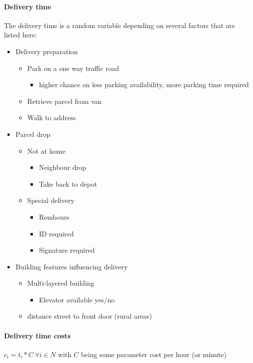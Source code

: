 \documentclass[a4paper,10pt,twoside]{report}
\begin{document}
\paragraph{Delivery time}
The delivery time is a random variable depending on several factors that are listed here: 
\begin{itemize}
\item Delivery preparation
\begin{itemize}
\item Park on a one way traffic road 
\begin{itemize}
\item higher chance on less parking availability, more parking time required
\end{itemize}
\item Retrieve parcel from van
\item Walk to address
\end{itemize}
\item Parcel drop
\begin{itemize}
\item Not at home
\begin{itemize}
\item Neighbour drop
\item Take back to depot
\end{itemize}
\item Special delivery
\begin{itemize}
\item Rembours
\item ID required
\item Signature required
\end{itemize}
\end{itemize}
\item Building features influencing delivery
\begin{itemize}
\item Multi-layered building
\begin{itemize}
\item Elevator available yes/no
\end{itemize}
\item distance street to front door (rural areas)
\end{itemize}
\end{itemize}

\paragraph{Delivery time costs}
$c_{i} = t_{i}*C\ \forall i \in N$
with $C$ being some parameter cost per hour (or minute)
\end{document}
